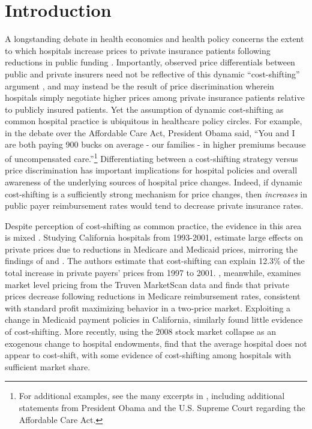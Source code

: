 \documentclass[12pt]{article}
\begin{document}
\section{Introduction}
A longstanding debate in health economics and health policy concerns the extent to which hospitals increase prices to private insurance patients following reductions in public funding \citep{dranove1988}. Importantly, observed price differentials between public and private insurers need not be reflective of this dynamic ``cost-shifting'' argument \citep{morrisey1994}, and may instead be the result of price discrimination wherein hospitals simply negotiate higher prices among private insurance patients relative to publicly insured patients. Yet the assumption of dynamic cost-shifting as common hospital practice is ubiquitous in healthcare policy circles. For example, in the debate over the Affordable Care Act, President Obama said, ``You and I are both paying 900 bucks on average - our families - in higher premiums because of uncompensated care.''\footnote{For additional examples, see the many excerpts in \cite{dranove2017}, including additional statements from President Obama and the U.S. Supreme Court regarding the Affordable Care Act.} Differentiating between a cost-shifting strategy versus price discrimination has important implications for hospital policies and overall awareness of the underlying sources of hospital price changes. Indeed, if dynamic cost-shifting is a sufficiently strong mechanism for price changes, then \textit{increases} in public payer reimbursement rates would tend to decrease private insurance rates.

Despite perception of cost-shifting as common practice, the evidence in this area is mixed \citep{morrisey1994,frakt2011}. Studying California hospitals from 1993-2001, \cite{zwanziger2006} estimate large effects on private prices due to reductions in Medicare and Medicaid prices, mirroring the findings of \cite{lee2003} and \cite{zwanziger2000}. The authors estimate that cost-shifting can explain 12.3\% of the total increase in private payers' prices from 1997 to 2001. \cite{white2013}, meanwhile, examines market level pricing from the Truven MarketScan data and finds that private prices decrease following reductions in Medicare reimbursement rates, consistent with standard profit maximizing behavior in a two-price market. Exploiting a change in Medicaid payment policies in California, \cite{dranove1998} similarly found little evidence of cost-shifting. More recently, using the 2008 stock market collapse as an exogenous change to hospital endowments, \cite{dranove2017} find that the average hospital does not appear to cost-shift, with some evidence of cost-shifting among hospitals with sufficient market share.
\end{document}
